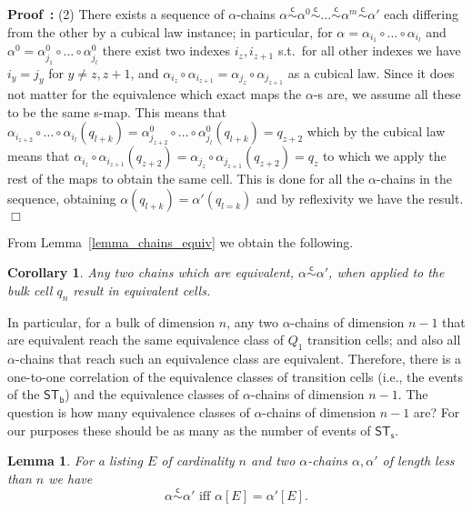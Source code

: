 \documentclass[submission,copyright,creativecommons]{eptcs}
\newtheorem{lemma}[theorem]{Lemma}
\newtheorem{corollary}[theorem]{Corollary}
\newenvironment{proof}[1][\!\!\,]{\vspace{1ex}\noindent\textbf{Proof #1: }}{\hfill$\Box$\vspace{2ex}}
\newcommand\sculpintost{\ensuremath{\mathsf{ST}_{\!\mathsf{s}}}}
\newcommand\hintostScultures{\ensuremath{\mathsf{ST}_{\!\mathsf{b}}}}
\newcommand\applyChainList[2]{\ensuremath{#1[#2]}}
\newcommand\chainEquivHDAsculpture{\ensuremath{\overset{\mathsf{c}}{\sim}}}
\begin{document}
\begin{proof}
(2) There exists a sequence of $\alpha$-chains $\alpha\chainEquivHDAsculpture\alpha^{0}\chainEquivHDAsculpture\dots\chainEquivHDAsculpture\alpha^{m}\chainEquivHDAsculpture\alpha'$ each differing from the other by a cubical law instance; in particular, for $\alpha=\alpha_{i_{1}}\circ\dots\circ\alpha_{i_{l}}$ and $\alpha^{0}=\alpha_{j_{1}}^{0}\circ\dots\circ\alpha_{j_{l}}^{0}$ there exist two indexes $i_{z},i_{z+1}$ s.t.\ for all other indexes we have $i_{y}=j_{y}$ for $y\neq z,z+1$, and $\alpha_{i_{z}}\circ\alpha_{i_{z+1}}=\alpha_{j_{z}}\circ\alpha_{j_{z+1}}$ as a cubical law. Since it does not matter for the equivalence which exact maps the $\alpha$-s are, we assume all these to be the same s-map.
This means that $\alpha_{i_{z+2}}\circ\dots\circ\alpha_{i_{l}}(q_{l+k})=\alpha_{j_{z+2}}^{0}\circ\dots\circ\alpha_{j_{l}}^{0}(q_{l+k})=q_{z+2}$ which by the cubical law means that $\alpha_{i_{z}}\circ\alpha_{i_{z+1}}(q_{z+2})=\alpha_{j_{z}}\circ\alpha_{j_{z+1}}(q_{z+2})=q_{z}$ to which we apply the rest of the maps to obtain the same cell. This is done for all the $\alpha$-chains in the sequence, obtaining $\alpha(q_{l+k})=\alpha'(q_{l=k})$ and by reflexivity we have the result.
\end{proof}


From Lemma~\ref{lemma_chains_equiv} we obtain the following.

\begin{corollary}
Any two chains which are equivalent, $\alpha\chainEquivHDAsculpture\alpha'$, when applied to the bulk cell $q_{n}$ result in equivalent cells. 
\end{corollary}

In particular, for a bulk of dimension $n$, any two $\alpha$-chains of dimension $n-1$ that are equivalent reach the same equivalence class of $Q_{1}$ transition cells; and also all $\alpha$-chains that reach such an equivalence class are equivalent. Therefore, there is a one-to-one correlation of the equivalence classes of transition cells (i.e., the events of the \hintostScultures) and the equivalence classes of $\alpha$-chains of dimension $n-1$.
The question is how many equivalence classes of $\alpha$-chains of dimension $n-1$ are? For our purposes these should be as many as the number of events of \sculpintost.

\begin{lemma}\label{lemma_on_scultures_equalEventSets}
For a listing $E$ of cardinality $n$ and two $\alpha$-chains $\alpha,\alpha'$ of length less than $n$ we have
\[
\alpha\chainEquivHDAsculpture\alpha' \mbox{\ \ iff\ \ }\applyChainList{\alpha}{E}=\applyChainList{\alpha'}{E}.
\]
\end{lemma}
\end{document}
